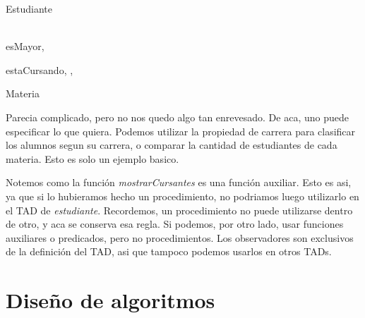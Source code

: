 \documentclass{article}
\begin{document}
\begin{tad}{Estudiante}
	 \\
	 \\
	
	\begin{proc}{esMayor}{, }
	\end{proc}

	\begin{proc}{estaCursando}{, , }
	\end{proc}
\end{tad}

\begin{tad}{Materia}
	 \\
	
\end{tad}

Parecia complicado, pero no nos quedo algo tan enrevesado. De aca, uno puede especificar lo que quiera. Podemos utilizar la propiedad de carrera para clasificar los alumnos segun su carrera, o comparar la cantidad de estudiantes de cada materia. Esto es solo un ejemplo basico.

Notemos como la función \textit{mostrarCursantes} es una función auxiliar. Esto es asi, ya que si lo hubieramos hecho un procedimiento, no podriamos luego utilizarlo en el TAD de \textit{estudiante}. Recordemos, un procedimiento no puede utilizarse dentro de otro, y aca se conserva esa regla. Si podemos, por otro lado, usar funciones auxiliares o predicados, pero no procedimientos. Los observadores son exclusivos de la definición del TAD, asi que tampoco podemos usarlos en otros TADs.

\newpage
\section{Diseño de algoritmos}
\end{document}

